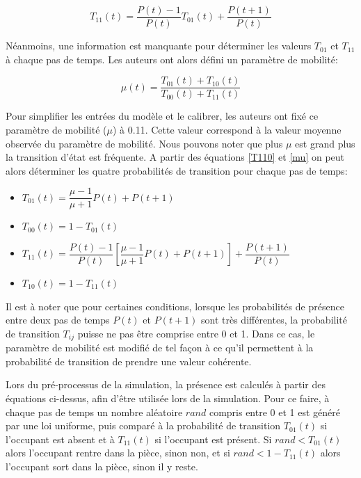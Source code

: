 \begin{equation}
T_{11}(t)=\dfrac{P(t)-1}{P(t)}T_{01}(t)+\dfrac{P(t+1)}{P(t)}
\label{T110}
\end{equation}

Néanmoins, une information est manquante pour déterminer les valeurs $T_{01}$ et $T_{11}$ à chaque pas de temps. Les auteurs ont alors défini un paramètre de mobilité:

\begin{equation}
\mu(t)=\dfrac{T_{01}(t)+T_{10}(t)}{T_{00}(t)+T_{11}(t)}
\label{mu}
\end{equation}

Pour simplifier les entrées du modèle et le calibrer, les auteurs ont fixé ce paramètre de mobilité ($\mu$) à 0.11. Cette valeur correspond à la valeur moyenne observée du paramètre de mobilité. Nous pouvons noter que plus $\mu$ est grand plus la transition d'état est fréquente.
A partir des équations \eqref{T110} et \eqref{mu} on peut alors déterminer les quatre probabilités de transition pour chaque pas de temps:

\begin{itemize}
\item $T_{01}(t)=\dfrac{\mu-1}{\mu+1}P(t)+P(t+1)$
\item $T_{00}(t)=1-T_{01}(t)$
\item $T_{11}(t)=\dfrac{P(t)-1}{P(t)}\left[\dfrac{\mu-1}{\mu+1}P(t)+P(t+1)\right]+\dfrac{P(t+1)}{P(t)}$
\item $T_{10}(t)=1-T_{11}(t)$
\end{itemize}

Il est à noter que pour certaines conditions, lorsque les probabilités de présence entre deux pas de temps $P(t)$ et $P(t+1)$ sont très différentes, la probabilité de transition $T_{ij}$ puisse ne pas être comprise entre 0 et 1. Dans ce cas, le paramètre de mobilité est modifié de tel façon à ce qu'il permettent à la probabilité de transition de prendre une valeur cohérente.

Lors du pré-processus de la simulation, la présence est calculés à partir des équations ci-dessus, afin d'être utilisée lors de la simulation. Pour ce faire, à chaque pas de temps un nombre aléatoire $rand$ compris entre 0 et 1 est généré par une loi uniforme, puis comparé à la probabilité de transition $T_{01}(t)$ si l'occupant est absent et à $T_{11}(t)$ si l'occupant est présent. Si $rand < T_{01}(t)$ alors l'occupant rentre dans la pièce, sinon non, et si $rand < 1-T_{11}(t)$ alors l'occupant sort dans la pièce, sinon il y reste.

